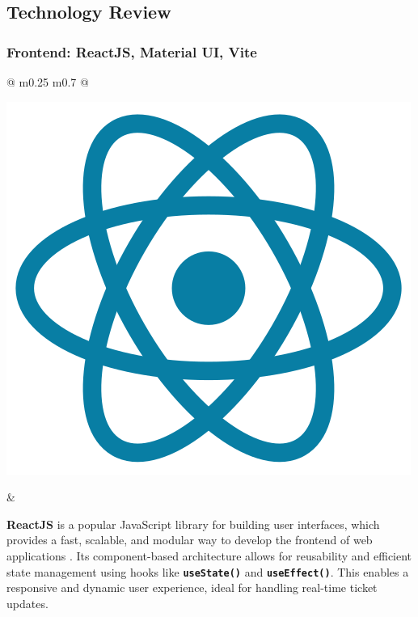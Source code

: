 \subsection{Technology Review}

	\subsubsection{Frontend: ReactJS, Material UI, Vite}
	
	
	
	  \begin{tabular}{ @{} m{0.25\textwidth} m{0.7\textwidth} @{} }
		\begin{minipage}{\linewidth}
			\centering
			\includegraphics[width=0.6\linewidth]{graphics/React_Logo_SVG.png}
			\label{fig:react}
		\end{minipage}
		&
		\begin{minipage}{\linewidth}
			\textbf{ReactJS} is a popular JavaScript library for building user interfaces, which provides a fast, scalable, and modular way to develop the frontend of web applications \cite{react}. Its component-based architecture allows for reusability and efficient state management using hooks like \textbf{\texttt{useState()}} and \textbf{\texttt{useEffect()}}. This enables a responsive and dynamic user experience, ideal for handling real-time ticket updates.
		\end{minipage}
	\end{tabular}
	
	\vspace*{1cm}
	
